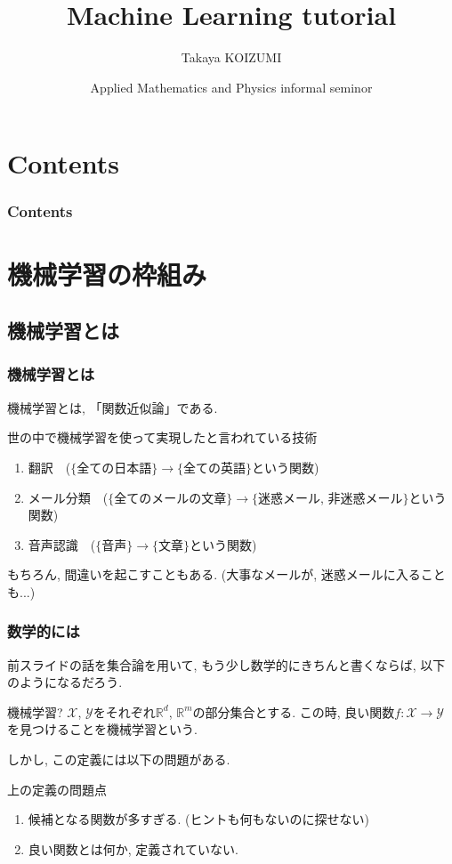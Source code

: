\documentclass[dvipdfmx,11pt]{beamer}		%
\title{Machine Learning tutorial}
\author{Takaya KOIZUMI}
\institute{Mathematical Science, B4}
\date{Applied Mathematics and Physics informal seminor}
\newcommand{\R}{\mathbb{R}}
\newcommand{\X}{\mathcal{X}}
\newcommand{\Y}{\mathcal{Y}}
\begin{document}
    \begin{frame}\frametitle{}
        \titlepage
    \end{frame}
    \section*{Contents}
    \begin{frame}\frametitle{Contents}
            \tableofcontents
    \end{frame}
    \section{機械学習の枠組み}
    \subsection{機械学習とは}
    \begin{frame}\frametitle{機械学習とは}
        機械学習とは, 「関数近似論」である.
        \begin{block}{世の中で機械学習を使って実現したと言われている技術}
            \begin{enumerate}
                \item 翻訳~~($\{$全ての日本語$\}$$\to$$\{$全ての英語$\}$という関数)
                \item メール分類~~($\{$全てのメールの文章$\}$$\to$$\{$迷惑メール, 非迷惑メール$\}$という関数)
                \item 音声認識~~($\{$音声$\}$$\to$$\{$文章$\}$という関数)
            \end{enumerate}
        \end{block}
        もちろん, 間違いを起こすこともある. (大事なメールが, 迷惑メールに入ることも...)
    \end{frame}
    \begin{frame}\frametitle{数学的には}
        前スライドの話を集合論を用いて, もう少し数学的にきちんと書くならば, 以下のようになるだろう.
        \begin{block}{機械学習?}
            $\X$, $\Y$をそれぞれ$\R^d$, $\R^m$の部分集合とする. 
            この時, 良い関数$f:\X\to\Y$を見つけることを機械学習という. 
        \end{block} 
        しかし, この定義には以下の問題がある.
        \begin{block}{上の定義の問題点}
            \begin{enumerate}
                \item 候補となる関数が多すぎる. (ヒントも何もないのに探せない)
                \item 良い関数とは何か, 定義されていない.
            \end{enumerate}
        \end{block}
    \end{frame}
\end{document}
